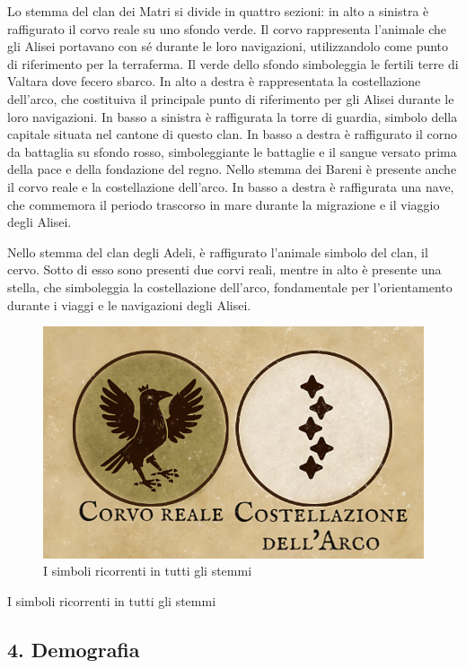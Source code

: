 Lo stemma del clan dei Matri si divide in quattro sezioni: in alto a
sinistra è raffigurato il corvo reale su uno sfondo verde. Il corvo
rappresenta l'animale che gli Alisei portavano con sé durante le loro
navigazioni, utilizzandolo come punto di riferimento per la terraferma.
Il verde dello sfondo simboleggia le fertili terre di Valtara dove
fecero sbarco. In alto a destra è rappresentata la costellazione
dell'arco, che costituiva il principale punto di riferimento per gli
Alisei durante le loro navigazioni. In basso a sinistra è raffigurata la
torre di guardia, simbolo della capitale situata nel cantone di questo
clan. In basso a destra è raffigurato il corno da battaglia su sfondo
rosso, simboleggiante le battaglie e il sangue versato prima della pace
e della fondazione del regno. Nello stemma dei Bareni è presente anche
il corvo reale e la costellazione dell'arco. In basso a destra è
raffigurata una nave, che commemora il periodo trascorso in mare durante
la migrazione e il viaggio degli Alisei.

Nello stemma del clan degli Adeli, è raffigurato l'animale simbolo del
clan, il cervo. Sotto di esso sono presenti due corvi reali, mentre in
alto è presente una stella, che simboleggia la costellazione dell'arco,
fondamentale per l'orientamento durante i viaggi e le navigazioni degli
Alisei.

\begin{figure}
\centering
\includegraphics{Screenshot_2023-10-20_170853.png}
\caption{I simboli ricorrenti in tutti gli stemmi}
\end{figure}

I simboli ricorrenti in tutti gli stemmi

\subsection{4. Demografia}\label{demografia}

